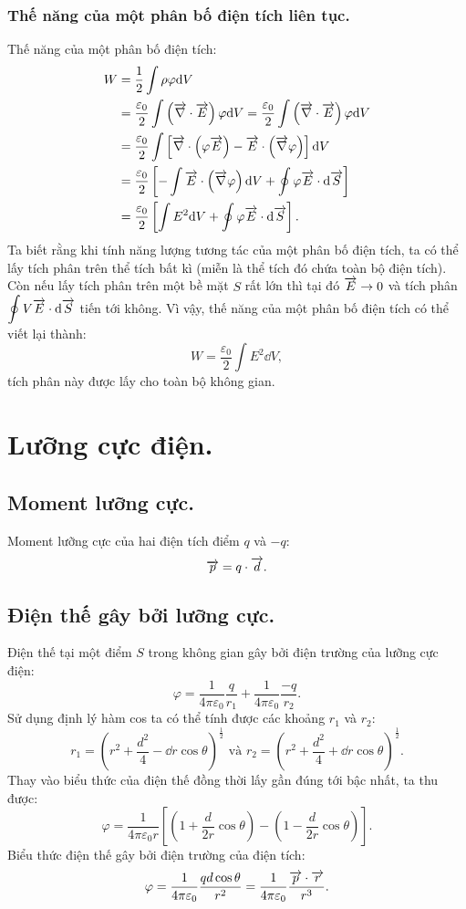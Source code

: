 \begin{appendices}
\subsubsection{Thế năng của một phân bố điện tích liên tục.}
    Thế năng của một phân bố điện tích:
    \begin{align*}
    W&=\dfrac{1}{2}\int\rho \varphi\mathrm{d} V\\
    &=\dfrac{\varepsilon_0}{2}\int \left(\overrightarrow{\nabla}\cdot \overrightarrow{E}\right)\varphi\mathrm{d} V 
    =\dfrac{\varepsilon_0}{2}\int \left(\overrightarrow{\nabla}\cdot \overrightarrow{E}\right)\varphi\mathrm{d} V\\
    &=\dfrac{\varepsilon_0}{2}\int \left[\overrightarrow{\nabla}\cdot\left(\varphi\overrightarrow{E}\right)-\overrightarrow{E}\cdot\left(\overrightarrow{\nabla}\varphi\right)\right] \mathrm{d} V\\
    &=\dfrac{\varepsilon_0}{2} \left[-\int\overrightarrow{E}\cdot\left(\overrightarrow{\nabla}\varphi\right)\mathrm{d} V+\oint \varphi\overrightarrow{E}\cdot\mathrm{d} \overrightarrow{S}\right] \\
    &=\dfrac{\varepsilon_0}{2} \left[\int E^2\mathrm{d} V+\oint \varphi \overrightarrow{E}\cdot\mathrm{d} \overrightarrow{S}\right].
    \end{align*}
    Ta biết rằng khi tính năng lượng tương tác của một phân bố điện tích, ta có thể lấy tích phân trên thể tích bất kì (miễn là thể tích đó chứa toàn bộ điện tích). Còn nếu lấy tích phân trên một bề mặt $S$ rất lớn thì tại đó $\overrightarrow{E}\rightarrow 0$ và tích phân $\displaystyle\oint V\overrightarrow{E}\cdot\mathrm{d} \overrightarrow{S}$ tiến tới không. Vì vậy, thế năng của một phân bố điện tích có thể viết lại thành:
    $$W=\dfrac{\varepsilon_0}{2} \int E^2\dd V,$$
    tích phân này được lấy cho toàn bộ không gian.
\section{Lưỡng cực điện.}
\subsection{Moment lưỡng cực.}
    Moment lưỡng cực của hai điện tích điểm $q$ và $-q$:
    $$\overrightarrow{p}=q\cdot\overrightarrow{d}.$$
\subsection{Điện thế gây bởi lưỡng cực.}
     Điện thế tại một điểm $S$ trong không gian gây bởi điện trường của lưỡng cực điện:\\
     $$\varphi=\dfrac{1}{4\pi \varepsilon_0}\dfrac{q}{r_1}+\dfrac{1}{4\pi \varepsilon_0}\dfrac{-q}{r_2}.$$
    Sử dụng định lý hàm cos ta có thể tính được các khoảng $r_1$ và $r_2$:
    $$ r_1=\left(r^2+\dfrac{d^2}{4}-\dd r\cos{\theta}\right)^{\frac{1}{2}} \text{ và } r_2=\left(r^2+\dfrac{d^2}{4}+\dd r\cos{\theta}\right)^{\frac{1}{2}}.$$
    Thay vào biểu thức của điện thế đồng thời lấy gần đúng tới bậc nhất, ta thu được:
    $$\varphi=\dfrac{1}{4\pi \varepsilon_0 r}\left[\left(1+\dfrac{d}{2r}\cos{\theta}\right)-\left(1-\dfrac{d}{2r}\cos{\theta}\right)\right].$$
    Biểu thức điện thế gây bởi điện trường của điện tích:
    $$\varphi=\dfrac{1}{4\pi\varepsilon_0}\dfrac{qd\cos{\theta}}{r^2}=\dfrac{1}{4\pi \varepsilon_0}\dfrac{\overrightarrow{p}\cdot\overrightarrow{r}}{r^3}.$$

\end{appendices}
